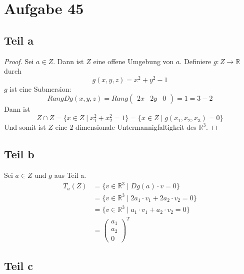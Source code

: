 \documentclass[10pt,a4paper]{article}
\begin{document}
\section{Aufgabe 45}

\subsection{Teil a}

\begin{proof}
  Sei $a \in Z$.
  Dann ist $Z$ eine offene Umgebung von $a$.
  Definiere $g : Z \rightarrow \mathbb{R}$ durch
  \begin{equation}
    g(x, y, z) = x^{2} + y^{2} - 1
  \end{equation}
  $g$ ist eine Submersion:
  \begin{equation}
    Rang Dg(x, y, z) = Rang \begin{pmatrix}
      2x & 2y & 0
    \end{pmatrix} = 1 = 3 - 2
  \end{equation}
  Dann ist
  \begin{equation}
    Z \cap Z = \{ x \in Z \mid x_{1}^{2} + x_{2}^{2} = 1 \} = \{ x \in Z \mid g(x_{1}, x_{2}, x_{3}) = 0 \}
  \end{equation}
  Und somit ist $Z$ eine 2-dimensionale Untermannigfaltigkeit des $\mathbb{R}^{3}$.
\end{proof}

\subsection{Teil b}

Sei $a \in Z$ und $g$ aus Teil a.
\begin{align*}
  T_{a}(Z) & = \{ v \in \mathbb{R}^{3} \mid Dg(a) \cdot v = 0 \}\\
  & = \{ v \in \mathbb{R}^{3} \mid 2a_{1} \cdot v_{1} + 2a_{2} \cdot v_{2} = 0 \}\\
  & = \{ v \in \mathbb{R}^{3} \mid a_{1} \cdot v_{1} + a_{2} \cdot v_{2} = 0 \}\\
  & = \begin{pmatrix}
    a_{1}\\a_{2}\\0
  \end{pmatrix}^{T}
\end{align*}

\subsection{Teil c}
\end{document}
